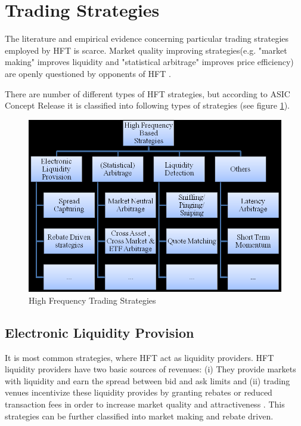 \documentclass[12pt,a4paper]{article}
\numberwithin{equation}{section}
\numberwithin{figure}{section}
\numberwithin{table}{section}
\begin{document}
\section{Trading Strategies}\label{sec:ts}

The literature and empirical evidence concerning particular trading strategies employed by HFT is scarce. Market quality improving strategies(e.g. "market making" improves liquidity and "statistical arbitrage" improves price efficiency) are openly questioned by opponents of HFT \citep{arnuk2009}. 

There are number of different types of HFT strategies, but according to ASIC Concept Release \citep{ASIC2010} it is classified into following types of strategies (see figure \ref{fig:HFTS}).
\begin{figure}[ht]
\begin{center}
\includegraphics[width=\textwidth]{HFTS}
\caption{High Frequency Trading Strategies \citep{gomer2011}}
\label{fig:HFTS}
\end{center}
\end{figure} 

\subsection{Electronic Liquidity Provision}
It is most common strategies, where HFT act as liquidity providers. HFT liquidity providers have two basic sources of revenues: (i) They provide markets with liquidity and earn the spread between bid and ask limits and (ii) trading venues incentivize these liquidity provides by granting rebates or reduced transaction fees in order to increase
market quality and attractiveness \citep{gomer2011}. This strategies can be further classified into market making and rebate driven. 
\end{document}

